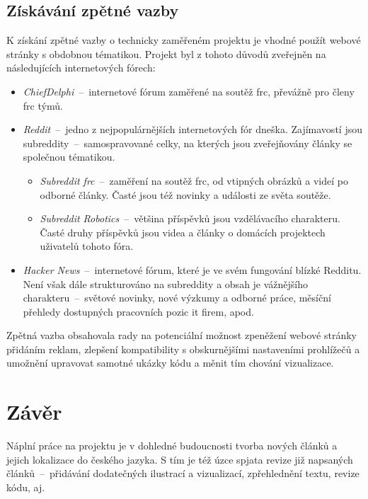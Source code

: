 \documentclass[a4paper, 12pt]{article}
\begin{document}


  \subsection{Získávání zpětné vazby}
  K získání zpětné vazby o technicky zaměřeném projektu je vhodné použít webové stránky s obdobnou tématikou. Projekt byl z tohoto důvodů zveřejněn na následujících internetových fórech:

  {\parskip=0pt
  \begin{itemize}[topsep=\itemsep]
    \item \emph{ChiefDelphi}~--~internetové fórum zaměřené na soutěž \gls{frc}, převážně pro členy \gls{frc} týmů.
    \item \emph{Reddit}~--~jedno z nejpopulárnějších internetových fór dneška. Zajímavostí jsou subreddity~--~samospravované celky, na kterých jsou zveřejňovány články se společnou tématikou.
    \begin{itemize}[topsep=0pt]
      \item \emph{Subreddit \gls{frc}}~--~zaměření na soutěž \gls{frc}, od vtipných obrázků a videí po odborné články. Časté jsou též novinky a události ze světa soutěže.
      \item \emph{Subreddit Robotics}~--~většina příspěvků jsou vzdělávacího charakteru. Časté druhy příspěvků jsou videa a články o domácích projektech uživatelů tohoto fóra.
    \end{itemize}
    \item \emph{Hacker News}~--~internetové fórum, které je ve svém fungování blízké Redditu. Není však dále strukturováno na subreddity a obsah je vážnějšího charakteru~--~světové novinky, nové výzkumy a odborné práce, měsíční přehledy dostupných pracovních pozic \gls{it} firem, apod.
  \end{itemize}}

  Zpětná vazba obsahovala rady na potenciální možnost zpeněžení webové stránky přidáním reklam, zlepšení kompatibility s obskurnějšími nastaveními prohlížečů a umožnění upravovat samotné ukázky kódu a měnit tím chování vizualizace.

  \newpage

  \section{Závěr}

  Náplní práce na projektu je v dohledné budoucnosti tvorba nových článků a jejich lokalizace do českého jazyka. S tím je též úzce spjata revize již napsaných článků~--~přidávání dodatečných ilustrací a vizualizací, zpřehlednění textu, revize kódu, aj.
\end{document}

